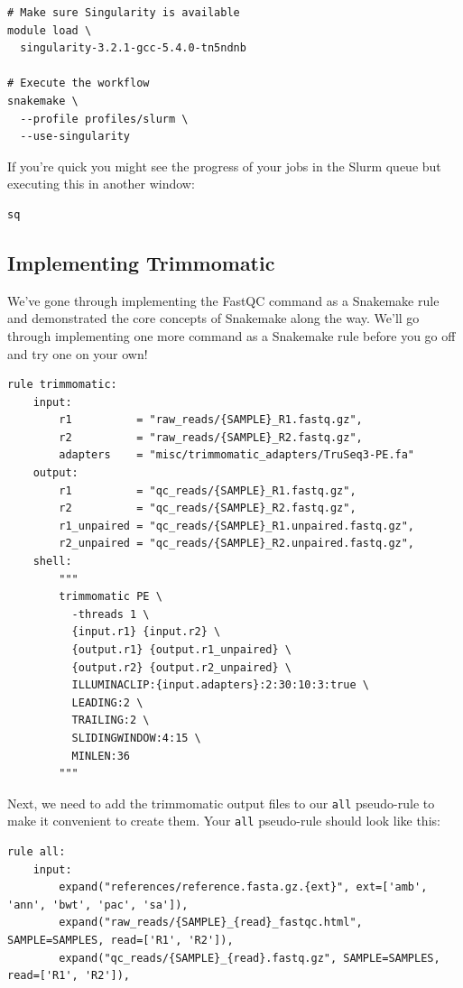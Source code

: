 \begin{lstlisting}
# Make sure Singularity is available
module load \
  singularity-3.2.1-gcc-5.4.0-tn5ndnb

# Execute the workflow
snakemake \
  --profile profiles/slurm \
  --use-singularity
\end{lstlisting}

If you're quick you might see the progress of your jobs in the Slurm queue but executing this in another window:

\begin{lstlisting}
sq
\end{lstlisting}

\subsection{Implementing Trimmomatic}

We've gone through implementing the FastQC command as a Snakemake rule and demonstrated the core concepts of
Snakemake along the way. We'll go through implementing one more command as a Snakemake rule before you go
off and try one on your own!

\begin{lstlisting}
rule trimmomatic:
	input:
		r1          = "raw_reads/{SAMPLE}_R1.fastq.gz",
		r2          = "raw_reads/{SAMPLE}_R2.fastq.gz",
		adapters    = "misc/trimmomatic_adapters/TruSeq3-PE.fa"
	output:
		r1          = "qc_reads/{SAMPLE}_R1.fastq.gz",
		r2          = "qc_reads/{SAMPLE}_R2.fastq.gz",
		r1_unpaired = "qc_reads/{SAMPLE}_R1.unpaired.fastq.gz",
		r2_unpaired = "qc_reads/{SAMPLE}_R2.unpaired.fastq.gz",
	shell:
		"""
		trimmomatic PE \
		  -threads 1 \
		  {input.r1} {input.r2} \
		  {output.r1} {output.r1_unpaired} \
		  {output.r2} {output.r2_unpaired} \
		  ILLUMINACLIP:{input.adapters}:2:30:10:3:true \
		  LEADING:2 \
		  TRAILING:2 \
		  SLIDINGWINDOW:4:15 \
		  MINLEN:36
		"""
\end{lstlisting}

Next, we need to add the trimmomatic output files to our \texttt{all} pseudo-rule to make it convenient to create them. Your \texttt{all}
pseudo-rule should look like this:

\begin{lstlisting}
rule all:
	input:
		expand("references/reference.fasta.gz.{ext}", ext=['amb', 'ann', 'bwt', 'pac', 'sa']),
		expand("raw_reads/{SAMPLE}_{read}_fastqc.html", SAMPLE=SAMPLES, read=['R1', 'R2']),
		expand("qc_reads/{SAMPLE}_{read}.fastq.gz", SAMPLE=SAMPLES, read=['R1', 'R2']),
\end{lstlisting}












